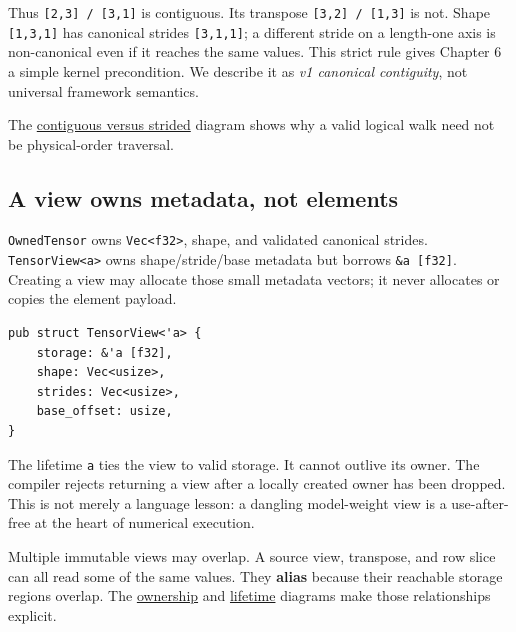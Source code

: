 \documentclass[
  10pt,
]{article}
\begin{document}
Thus \texttt{{[}2,3{]}\ /\ {[}3,1{]}} is contiguous. Its transpose
\texttt{{[}3,2{]}\ /\ {[}1,3{]}} is not. Shape \texttt{{[}1,3,1{]}} has
canonical strides \texttt{{[}3,1,1{]}}; a different stride on a
length-one axis is non-canonical even if it reaches the same values.
This strict rule gives Chapter 6 a simple kernel precondition. We
describe it as \emph{v1 canonical contiguity}, not universal framework
semantics.

The
\href{https://github.com/hermonai/inside-the-llm-engine/blob/astra-visual-rewrite/diagrams/tensor/contiguous-vs-strided.txt}{contiguous
versus strided} diagram shows why a valid logical walk need not be
physical-order traversal.

\subsection{A view owns metadata, not
elements}\label{a-view-owns-metadata-not-elements}

\texttt{OwnedTensor} owns \texttt{Vec\textless{}f32\textgreater{}},
shape, and validated canonical strides.
\texttt{TensorView\textless{}\textquotesingle{}a\textgreater{}} owns
shape/stride/base metadata but borrows
\texttt{\&\textquotesingle{}a\ {[}f32{]}}. Creating a view may allocate
those small metadata vectors; it never allocates or copies the element
payload.

\begin{verbatim}
pub struct TensorView<'a> {
    storage: &'a [f32],
    shape: Vec<usize>,
    strides: Vec<usize>,
    base_offset: usize,
}
\end{verbatim}

The lifetime \texttt{\textquotesingle{}a} ties the view to valid
storage. It cannot outlive its owner. The compiler rejects returning a
view after a locally created owner has been dropped. This is not merely
a language lesson: a dangling model-weight view is a use-after-free at
the heart of numerical execution.

Multiple immutable views may overlap. A source view, transpose, and row
slice can all read some of the same values. They \textbf{alias} because
their reachable storage regions overlap. The
\href{https://github.com/hermonai/inside-the-llm-engine/blob/astra-visual-rewrite/diagrams/tensor/tensor-ownership.txt}{ownership}
and
\href{https://github.com/hermonai/inside-the-llm-engine/blob/astra-visual-rewrite/diagrams/tensor/tensor-memory-lifetime.txt}{lifetime}
diagrams make those relationships explicit.
\end{document}
